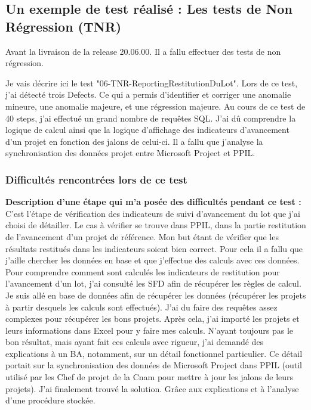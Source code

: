 \subsection{Un exemple de test réalisé : Les tests de Non Régression (TNR)}

Avant la livraison de la release 20.06.00. Il a fallu effectuer des tests de non régression.

Je vais décrire ici le test "06-TNR-ReportingRestitutionDuLot". Lors de ce test, j'ai détecté trois Defects. Ce qui a permis d'identifier et corriger une anomalie mineure, une anomalie majeure, et une régression majeure. Au cours de ce test de 40 steps, j'ai effectué un grand nombre de requêtes SQL. J'ai dû comprendre la logique de calcul ainsi que la logique d'affichage des indicateurs d'avancement d'un projet en fonction des jalons de celui-ci. Il a fallu que j'analyse la synchronisation des données projet entre Microsoft Project et PPIL.

\subsubsection{Difficultés rencontrées lors de ce test}

\textbf{Description d'une étape qui m'a posée des difficultés pendant ce test :}
C'est l'étape de vérification des indicateurs de suivi d'avancement du lot que j'ai choisi de détailler.
Le cas à vérifier se trouve dans PPIL, dans la partie restitution de l'avancement d'un projet de référence. Mon but étant de vérifier que les résultats restitués dans les indicateurs soient bien correct. Pour cela il a fallu que j'aille chercher les données en base et que j'effectue des calculs avec ces données.
Pour comprendre comment sont calculés les indicateurs de restitution pour l'avancement d'un lot, j'ai consulté les SFD afin de récupérer les règles de calcul. Je suis allé en base de données afin de récupérer les données (récupérer les projets à partir desquels les calculs sont effectués). J'ai du faire des requêtes assez complexes pour récupérer les bons projets. Après cela, j'ai importé les projets et leurs informations dans Excel pour y faire mes calculs. N'ayant toujours pas le bon résultat, mais ayant fait ces calculs avec rigueur, j'ai demandé des explications à un BA, notamment, sur un détail fonctionnel particulier. Ce détail portait sur la synchronisation des données de Microsoft Project dans PPIL (outil utilisé par les Chef de projet de la Cnam pour mettre à jour les jalons de leurs projets). J'ai finalement trouvé la solution. Grâce aux explications et à l'analyse d'une procédure stockée.

